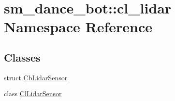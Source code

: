 \hypertarget{namespacesm__dance__bot_1_1cl__lidar}{}\section{sm\+\_\+dance\+\_\+bot\+:\+:cl\+\_\+lidar Namespace Reference}
\label{namespacesm__dance__bot_1_1cl__lidar}
\subsection*{Classes}
\begin{DoxyCompactItemize}
\item 
struct \hyperlink{structsm__dance__bot_1_1cl__lidar_1_1CbLidarSensor}{Cb\+Lidar\+Sensor}
\item 
class \hyperlink{classsm__dance__bot_1_1cl__lidar_1_1ClLidarSensor}{Cl\+Lidar\+Sensor}
\end{DoxyCompactItemize}
